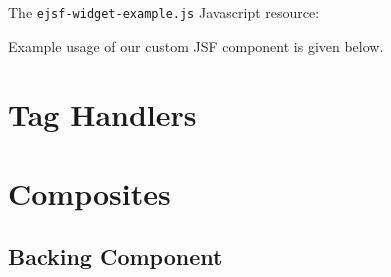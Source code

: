 The \texttt{ejsf-widget-example.js} Javascript resource:


Example usage of our custom JSF component is given below.


\section{Tag Handlers}

\section{Composites}

\subsection{Backing Component}